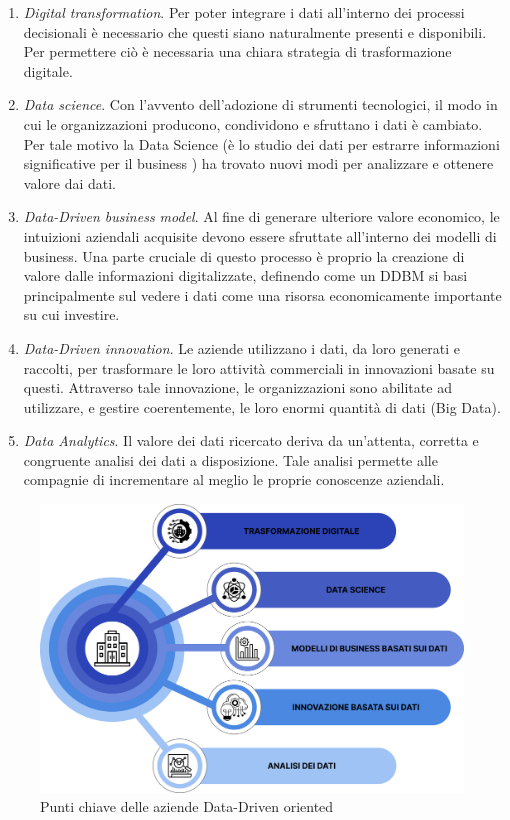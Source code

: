 \begin{enumerate}
    \item \textit{Digital transformation}. Per poter integrare i dati all'interno dei processi decisionali è necessario che questi siano naturalmente presenti e disponibili. Per permettere ciò è necessaria una chiara strategia di trasformazione digitale.
    \item \textit{Data science}. Con l'avvento dell'adozione di strumenti tecnologici, il modo in cui le organizzazioni producono, condividono e sfruttano i dati è cambiato. Per tale motivo la Data Science (è lo studio dei dati per estrarre informazioni significative per il business ) ha trovato nuovi modi per analizzare e ottenere valore dai dati.
    \item \textit{Data-Driven business model}. Al fine di generare ulteriore valore economico, le intuizioni aziendali acquisite devono essere sfruttate all'interno dei modelli di business. Una parte cruciale di questo processo è proprio la creazione di valore dalle informazioni digitalizzate, definendo come un DDBM si basi principalmente sul vedere i dati come una risorsa economicamente importante su cui investire.
    \item \textit{Data-Driven innovation}. Le aziende utilizzano i dati, da loro generati e raccolti, per trasformare le loro attività commerciali in innovazioni basate su questi. Attraverso tale innovazione, le organizzazioni sono abilitate ad utilizzare, e gestire coerentemente, le loro enormi quantità di dati (Big Data).
    \item \textit{Data Analytics}. Il valore dei dati ricercato deriva da un'attenta, corretta e congruente analisi dei dati a disposizione. Tale analisi permette alle compagnie di incrementare al meglio le proprie conoscenze aziendali.
\end{enumerate}

\begin{figure}[!h]
    \centering
    \includegraphics[width=0.8\linewidth]{figure/capitolo_1/Data-Driven company key points.pdf}
    \caption{Punti chiave delle aziende Data-Driven oriented}
    \label{fig:Data-Driven company key points}
\end{figure}

